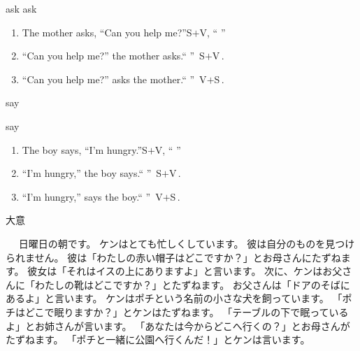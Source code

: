 \documentclass[aspectratio=169,xcolor={dvipsnames,table}]{beamer}
\begin{document}
\begin{frame}[plain]{ask}
\large
ask \hspace{20pt}

\begin{enumerate}
 \item<3-> The mother asks, ``Can you help me?''\hfill{}S$+$V,\,\,``\,\,''
 \item<4-> ``Can you help me?'' the mother asks.\hfill{}``\,\,''\,\,\,S$+$V\,.
 \item<5-> ``Can you help me?'' asks the mother.\hfill{}``\,\,''\,\,\,V$+$S\,.
\end{enumerate}

\vspace{20pt}

\small

\hfill{}

\hfill{}
\end{frame}
\begin{frame}[plain]{say}
\large

say \hspace{20pt}

 \begin{enumerate}
  \item<3-> The boy says, ``I'm hungry.''\hfill{}S$+$V,\,\,``\,\,''
  \item<4-> ``I'm hungry,'' the boy says.\hfill{}``\,\fbox{　　　　,}\,''\,\,\,S$+$V\,.
  \item<5-> ``I'm hungry,'' says the boy.\hfill{}``\,\fbox{　　　　,}\,''\,\,\,V$+$S\,.
 \end{enumerate}
\vspace{20pt}

\small

\hfill{}

\hfill{}
\end{frame}
\begin{frame}[plain]{大意}
 
\begin{tcolorbox}[title=ケンの忙しい朝]
　 日曜日の朝です。
ケンはとても忙しくしています。
彼は自分のものを見つけられません。 
彼は「わたしの赤い帽子はどこですか？」とお母さんにたずねます。
彼女は「それはイスの上にありますよ」と言います。
次に、ケンはお父さんに「わたしの靴はどこですか？」とたずねます。
お父さんは「ドアのそばにあるよ」と言います。
ケンはポチという名前の小さな犬を飼っています。
「ポチはどこで眠りますか？」とケンはたずねます。
「テーブルの下で眠っているよ」とお姉さんが言います。
「あなたは今からどこへ行くの？」とお母さんがたずねます。
「ポチと一緒に公園へ行くんだ！」とケンは言います。
\end{tcolorbox}
\end{frame}
\end{document}
